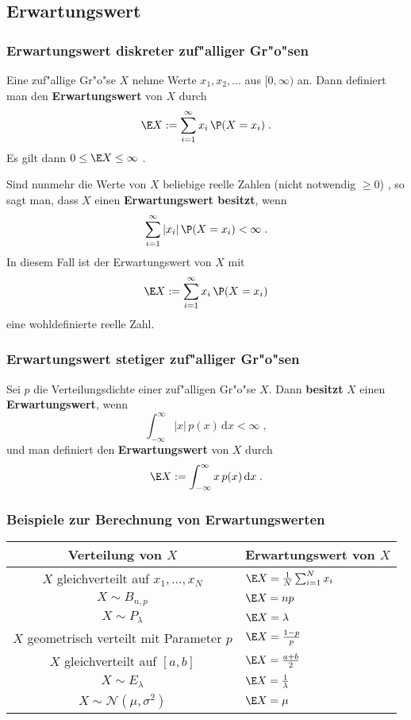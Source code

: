 \documentclass[ngerman,draft,parskip=half,twoside]{scrartcl}
\begin{document}
\subsection{Erwartungswert}
\subsubsection{Erwartungswert diskreter zuf"alliger Gr"o"sen}
Eine zuf"allige Gr"o"se $X$ nehme Werte $x_1,x_2,\ldots$ aus $[0,\infty)$ an. Dann
definiert man den \textbf{Erwartungswert} von $X$ durch
$$
\E X :=\sum_{i=1}^\infty x_i\,\P(X=x_i)\;.
$$
Es gilt dann $0\le \E X \le \infty$ .

Sind nunmehr die Werte von $X$ beliebige reelle Zahlen (nicht notwendig $\ge 0$)
, so sagt man, dass $X$ einen \textbf{Erwartungswert
besitzt}, wenn
$$
\sum_{i=1}^\infty |x_i|\,\P(X=x_i)<\infty\;.
$$
In diesem Fall ist der Erwartungswert von $X$ mit
$$
\E X :=\sum_{i=1}^\infty x_i\,\P(X=x_i)
$$
eine wohldefinierte reelle Zahl.

\subsubsection{Erwartungswert stetiger zuf"alliger Gr"o"sen}
Sei $p$ die Verteilungsdichte einer zuf"alligen Gr"o"se $X$. Dann \textbf{besitzt} $X$ einen
\textbf{Erwartungswert}, wenn
$$
\int_{-\infty}^\infty |x|\,p(x)\,\mathrm   d x <\infty\;,
$$
und man definiert den \textbf{Erwartungswert} von $X$ durch
$$
\E X := \int_{-\infty}^\infty x \,p(x)\,\mathrm   d x\;.
$$
\subsubsection{Beispiele zur Berechnung von Erwartungswerten}
\medskip

{\renewcommand{\arraystretch}{1.4}
\begin{center}
\begin{tabular}{|c|l|}\hline
\bf Verteilung von $X$& \bf Erwartungswert von $X$\\ \hline\hline
$X$ gleichverteilt auf $x_1,\ldots,x_N$& $\E X=\frac{1}{N}\sum_{i=1}^N x_i$\\ \hline
$X\sim B_{n,p}$& $\E X= n p$\\ \hline
$X\sim P_\lambda$&$\E X= \lambda$\\ \hline
$X$ geometrisch verteilt mit Parameter $p$& $\E X = \frac{1-p}{p}$\\ \hline
$X$ gleichverteilt auf $[a,b]$& $\E X= \frac{a+b}{2}$\\ \hline
$X\sim E_\lambda$& $\E X = \frac{1}{\lambda}$\\ \hline
$X\sim \mathcal N(\mu,\sigma^2)$&$ \E X = \mu$\\ \hline
\end{tabular}
\end{center}
}
\end{document}
